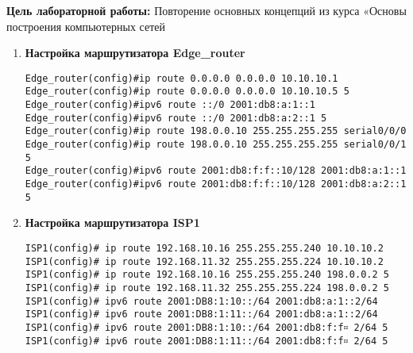 \documentclass[a4paper,14pt]{extarticle}
\begin{document}
    \textbf{Цель лабораторной работы:}
    Повторение основных концепций из курса «Основы построения компьютерных сетей
    

    \begin{enumerate}
        \item \textbf{Настройка маршрутизатора Edge\_router}
        \begin{lstlisting}
Edge_router(config)#ip route 0.0.0.0 0.0.0.0 10.10.10.1
Edge_router(config)#ip route 0.0.0.0 0.0.0.0 10.10.10.5 5
Edge_router(config)#ipv6 route ::/0 2001:db8:a:1::1
Edge_router(config)#ipv6 route ::/0 2001:db8:a:2::1 5
Edge_router(config)#ip route 198.0.0.10 255.255.255.255 serial0/0/0
Edge_router(config)#ip route 198.0.0.10 255.255.255.255 serial0/0/1 5
Edge_router(config)#ipv6 route 2001:db8:f:f::10/128 2001:db8:a:1::1
Edge_router(config)#ipv6 route 2001:db8:f:f::10/128 2001:db8:a:2::1 5
        \end{lstlisting}
        \item \textbf{Настройка маршрутизатора ISP1}
        \begin{lstlisting}
ISP1(config)# ip route 192.168.10.16 255.255.255.240 10.10.10.2
ISP1(config)# ip route 192.168.11.32 255.255.255.224 10.10.10.2
ISP1(config)# ip route 192.168.10.16 255.255.255.240 198.0.0.2 5
ISP1(config)# ip route 192.168.11.32 255.255.255.224 198.0.0.2 5
ISP1(config)# ipv6 route 2001:DB8:1:10::/64 2001:db8:a:1::2/64
ISP1(config)# ipv6 route 2001:DB8:1:11::/64 2001:db8:a:1::2/64
ISP1(config)# ipv6 route 2001:DB8:1:10::/64 2001:db8:f:f። 2/64 5
ISP1(config)# ipv6 route 2001:DB8:1:11::/64 2001:db8:f:f። 2/64 5
        \end{lstlisting}
    \end{enumerate}
\end{document}

